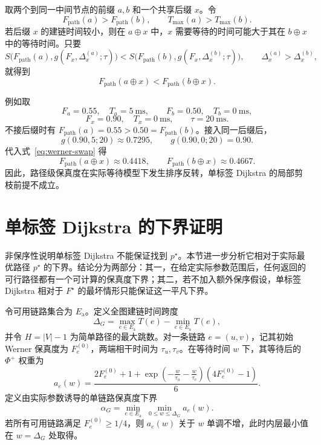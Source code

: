 取两个到同一中间节点的前缀 $a,b$ 和一个共享后缀 $x$。令
\[
F_{\mathrm{path}}(a)>F_{\mathrm{path}}(b),
\qquad
T_{\max}(a)>T_{\max}(b).
\]
若后缀 $x$ 的建链时间较小，则在 $a\oplus x$ 中，$x$ 需要等待的时间可能大于其在 $b\oplus x$ 中的等待时间。只要
\[
S\!\bigl(F_{\mathrm{path}}(a),g(F_x,\Delta_x^{(a)};\tau)\bigr)
<
S\!\bigl(F_{\mathrm{path}}(b),g(F_x,\Delta_x^{(b)};\tau)\bigr),
\qquad
\Delta_x^{(a)}>\Delta_x^{(b)},
\]
就得到
\[
F_{\mathrm{path}}(a\oplus x)
<
F_{\mathrm{path}}(b\oplus x).
\]

例如取
\[
F_a=0.55,\quad T_a=5\ \mathrm{ms},
\qquad
F_b=0.50,\quad T_b=0\ \mathrm{ms},
\]
\[
F_x=0.90,\quad T_x=0\ \mathrm{ms},
\qquad
\tau=20\ \mathrm{ms}.
\]
不接后缀时有 $F_{\mathrm{path}}(a)=0.55>0.50=F_{\mathrm{path}}(b)$。接入同一后缀后，
\[
g(0.90,5;20)\approx 0.7295,
\qquad
g(0.90,0;20)=0.90.
\]
代入式~\eqref{eq:werner-swap} 得
\[
F_{\mathrm{path}}(a\oplus x)\approx 0.4418,
\qquad
F_{\mathrm{path}}(b\oplus x)\approx 0.4667.
\]
因此，路径级保真度在实际等待模型下发生排序反转，单标签 Dijkstra 的局部剪枝前提不成立。

\section{单标签 Dijkstra 的下界证明}
\label{sec:dijkstra-lower-bound}

非保序性说明单标签 Dijkstra 不能保证找到 $p^\star$。本节进一步分析它相对于实际最优路径 $p^\star$ 的下界。结论分为两部分：其一，在给定实际参数范围后，任何返回的可行路径都有一个可计算的保真度下界；其二，若不加入额外保序假设，单标签 Dijkstra 相对于 $F^\star$ 的最坏情形只能保证这一平凡下界。

令可用链路集合为 $E_{\mathrm{a}}$。定义全图建链时间跨度
\begin{equation}
  \Delta_G
  =
  \max_{e\in E_{\mathrm{a}}} T(e)
  -
  \min_{e\in E_{\mathrm{a}}} T(e),
  \label{eq:global-time-span}
\end{equation}
并令 $H=|V|-1$ 为简单路径的最大跳数。对一条链路 $e=(u,v)$，记其初始 Werner 保真度为 $F_e^{(0)}$，两端相干时间为 $\tau_u,\tau_v$。在等待时间 $w$ 下，其等待后的 $\Phi^+$ 权重为
\begin{equation}
  a_e(w)
  =
  \frac{
    2F_e^{(0)}+1+
    \exp\!\left(-\frac{w}{\tau_u}-\frac{w}{\tau_v}\right)
    (4F_e^{(0)}-1)
  }{6}.
  \label{eq:edge-wait-lower-component}
\end{equation}
定义由实际参数诱导的单链路保真度下界
\begin{equation}
  \alpha_G
  =
  \min_{e\in E_{\mathrm{a}}}\;
  \min_{0\le w\le \Delta_G}
  a_e(w).
  \label{eq:alpha-g}
\end{equation}
若所有可用链路满足 $F_e^{(0)}\ge 1/4$，则 $a_e(w)$ 关于 $w$ 单调不增，此时内层最小值在 $w=\Delta_G$ 处取得。

